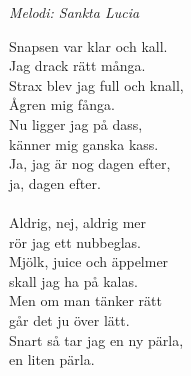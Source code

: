 {\footnotesize\textit{Melodi: Sankta Lucia}}\par
\vspace{10pt}
Snapsen var klar och kall.\\
Jag drack rätt många.\\
Strax blev jag full och knall,\\
Ågren mig fånga.\\
Nu ligger jag på dass,\\
känner mig ganska kass.\\
Ja, jag är nog dagen efter,\\
ja, dagen efter.\\
\\
Aldrig, nej, aldrig mer\\
rör jag ett nubbeglas.\\
Mjölk, juice och äppelmer\\
skall jag ha på kalas.\\
Men om man tänker rätt\\
går det ju över lätt.\\
Snart så tar jag en ny pärla,\\
en liten pärla.

